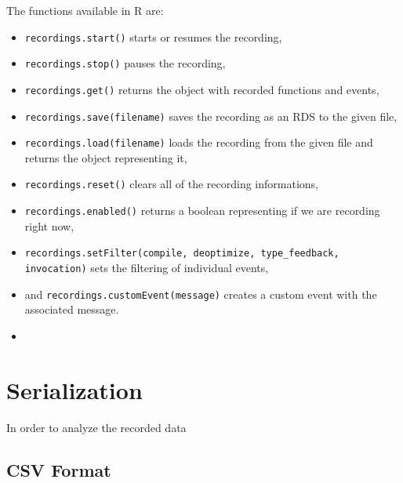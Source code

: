 The functions available in R are: 

\begin{itemize}
	\item \texttt{recordings.start()} starts or resumes the recording,
	\item \texttt{recordings.stop()} pauses the recording,
	\item \texttt{recordings.get()} returns the object with recorded functions and events,

	\item \texttt{recordings.save(filename)} saves the recording as an RDS to the given file,
	\item \texttt{recordings.load(filename)} loads the recording from the given file and returns the object representing it,

	\item \texttt{recordings.reset()} clears all of the recording informations,
	\item \texttt{recordings.enabled()} returns a boolean representing if we are recording right now,

	\item \texttt{recordings.setFilter(compile, deoptimize, type\_feedback, invocation)} sets the filtering of individual events,

	\item and \texttt{recordings.customEvent(message)} creates a custom event with the associated message.
	\item {}
\end{itemize}

\section{Serialization}

In order to analyze the recorded data

\subsection{CSV Format}
